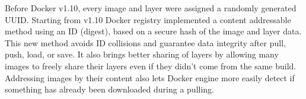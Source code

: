 Before Docker v1.10, every image and layer were assigned a randomly generated UUID.
%
%
Starting from v1.10 Docker registry implemented a content addressable method using an ID (digest), based on a secure hash of the image and layer data.
%
This new method avoids ID collisions and guarantee data integrity after pull, push, load, or save.
%
%
%
It also brings better sharing of layers by allowing many images to freely share their layers even if they didn't come from the same build.
%
Addressing images by their content also lets Docker engine more easily detect if something has already been downloaded during a pulling.
%



 







